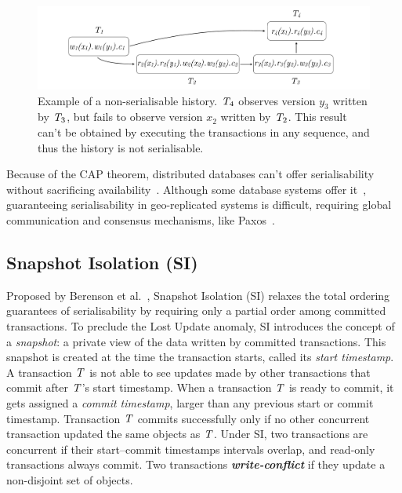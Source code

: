 \begin{figure}[h]
  \centering
  \vspace{-0.3cm}
  \includegraphics[width=\textwidth]{figures/non_ser_hist.pdf}
  \vspace{-1cm}
  \caption{Example of a non-serialisable history. $\mathit{T}_4$ observes version $y_3$ written by $\mathit{T}_3$, but fails to observe version $x_2$ written by $\mathit{T}_2$. This result can't be obtained by executing the transactions in any sequence, and thus the history is not serialisable.}
  \label{fig:non_ser_history}
\end{figure}

Because of the CAP theorem, distributed databases can't offer serialisability without sacrificing availability~\citep{cap-brewer, cap-theorem}. Although some database systems offer it~\citep{google_spanner}, guaranteeing serialisability in geo-replicated systems is difficult, requiring global communication and consensus mechanisms, like Paxos~\citep{lamport_paxos}.

\subsection{Snapshot Isolation (SI)}
\label{sect:si}

Proposed by Berenson et al.~\citep{sql-critique}, Snapshot Isolation (SI) relaxes the total ordering guarantees of serialisability by requiring only a partial order among committed transactions. To preclude the Lost Update anomaly, SI introduces the concept of a \emph{snapshot}: a private view of the data written by committed transactions. This snapshot is created at the time the transaction starts, called its \emph{start timestamp}. A transaction $\mathit{T}$ is not able to see updates made by other transactions that commit after $\mathit{T}$'s start timestamp. When a transaction $\mathit{T}$ is ready to commit, it gets assigned a \emph{commit timestamp}, larger than any previous start or commit timestamp. Transaction $\mathit{T}$ commits successfully only if no other concurrent transaction updated the same objects as $\mathit{T}$. Under SI, two transactions are concurrent if their start--commit timestamps intervals overlap, and read-only transactions always commit. Two transactions \textbf{\em write-conflict} if they update a non-disjoint set of objects.

